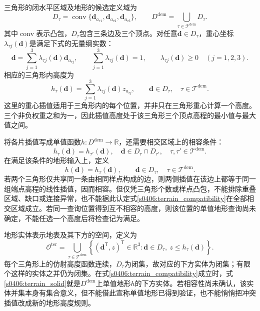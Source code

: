 三角形的闭水平区域及地形的候选定义域为
\begin{equation}
 D_\tau=\operatorname{conv}\{\mathbf d_{a_{\tau1}},
 \mathbf d_{a_{\tau2}},\mathbf d_{a_{\tau3}}\},
 \qquad
 D^{\mathrm{dem}}=\bigcup_{\tau\in\mathcal T^{\mathrm{dem}}}D_\tau.
 \label{s0406:terrain_domain}
\end{equation}
其中$\operatorname{conv}$表示凸包，$D_\tau$包含三条边及三个顶点。对任意$\mathbf d\in D_\tau$，重心坐标$\lambda_{\tau j}(\mathbf d)$是满足下式的无量纲实数：
\begin{equation}
 \mathbf d=\sum_{j=1}^{3}\lambda_{\tau j}(\mathbf d)
                 \mathbf d_{a_{\tau j}},
 \qquad
 \sum_{j=1}^{3}\lambda_{\tau j}(\mathbf d)=1,
 \qquad
 \lambda_{\tau j}(\mathbf d)\ge0\quad(j=1,2,3).
 \label{s0406:barycentric_coordinates}
\end{equation}
相应的三角形内高度为
\begin{equation}
 h_\tau(\mathbf d)=\sum_{j=1}^{3}
             \lambda_{\tau j}(\mathbf d)z_{a_{\tau j}},
 \qquad \mathbf d\in D_\tau,
 \quad \tau\in\mathcal T^{\mathrm{dem}}.
 \label{s0406:triangle_height}
\end{equation}
这里的重心插值适用于三角形内的每个位置，并非只在三角形重心计算一个高度。三个非负权重之和为一，因此插值高度处于该三角形三个顶点高程的最小值与最大值之间。

将各片插值写成单值函数$h:D^{\mathrm{dem}}\to\mathbb R$，还需要相交区域上的相容条件：
\begin{equation}
 h_\tau(\mathbf d)=h_{\tau'}(\mathbf d),
 \quad \mathbf d\in D_\tau\cap D_{\tau'},
 \quad \tau,\tau'\in\mathcal T^{\mathrm{dem}}.
 \label{s0406:terrain_compatibility}
\end{equation}
在满足该条件的地形输入上，定义
\begin{equation}
 h(\mathbf d)=h_\tau(\mathbf d),
 \qquad \mathbf d\in D_\tau,
 \quad \tau\in\mathcal T^{\mathrm{dem}}.
 \label{s0406:terrain_height}
\end{equation}
若两个三角形仅共享同一条由相同样点构成的边，则两侧插值在该边上都等于同一组端点高程的线性插值，因而相容。但仅凭三角形个数或样点凸包，不能排除重叠区域、缺口或连接异常，也不能据此认定式\eqref{s0406:terrain_compatibility}在全部相交区域成立。若同一查询位置得到互不相容的高度，则该位置的单值地形查询尚未确定，不能任选一个高度后将检查记为满足。

地形实体表示地表及其下方的空间，定义为
\begin{equation}
 \mathcal O^{\mathrm{ter}}
 =\bigcup_{\tau\in\mathcal T^{\mathrm{dem}}}
 \left\{(\mathbf d^{\mathsf T},z)^{\mathsf T}\in\mathbb R^3:
        \mathbf d\in D_\tau,\ z\le h_\tau(\mathbf d)\right\}.
 \label{s0406:terrain_solid}
\end{equation}
每个三角形上的仿射高度函数连续，$D_\tau$为闭集，故对应的下方实体为闭集；有限个这样的实体之并仍为闭集。在式\eqref{s0406:terrain_compatibility}成立时，式\eqref{s0406:terrain_solid}就是$D^{\mathrm{dem}}$上单值地形$h$的下方实体。若相容性尚未确认，该实体并集本身有集合意义，但不能借此宣称单值地形已得到验证，也不能悄悄把冲突插值改成新的地形高度规则。

